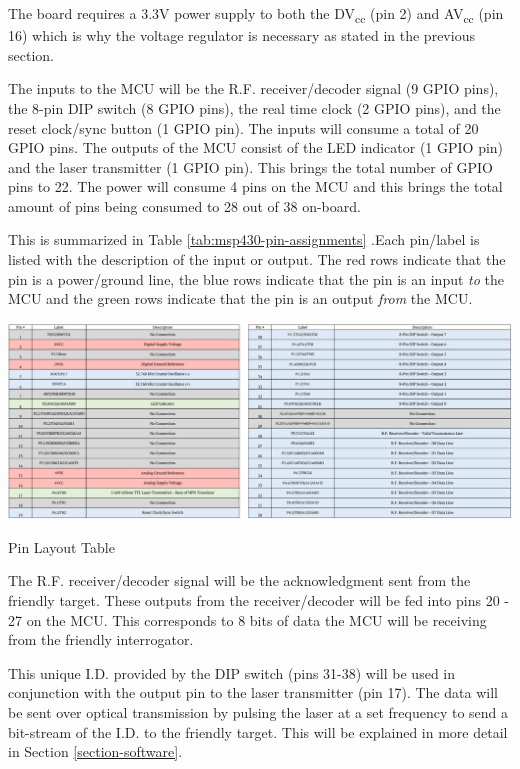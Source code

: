 \documentclass[letterpaper,10pt]{article}
\begin{document}
\begin{spacing}{1.15}
The board requires a 3.3V power supply to both the DV\textsubscript{cc} (pin 2) and AV\textsubscript{cc} (pin 16) which is why the voltage regulator is necessary as stated in the previous section. 

The inputs to the MCU will be the R.F. receiver/decoder signal (9 GPIO pins), the 8-pin DIP switch (8 GPIO pins), the real time clock (2 GPIO pins), and the reset clock/sync button (1 GPIO pin). The inputs will consume a total of 20 GPIO pins. The outputs of the MCU consist of the LED indicator (1 GPIO pin) and the laser transmitter (1 GPIO pin). This brings the total number of GPIO pins to 22. The power will consume 4 pins on the MCU and this brings the total amount of pins being consumed to 28 out of 38 on-board. 

This is summarized in Table \ref{tab:msp430-pin-assignments} .Each pin/label is listed with the description of the input or output. The red rows indicate that the pin is a power/ground line, the blue rows indicate that the pin is an input \textit{to} the MCU and the green rows indicate that the pin is an output \textit{from} the MCU.

\begin{table} [H]
	\centering
	\includegraphics[scale=0.37]{MSP430_Pin_Assignments_Interrogator.png}
	\caption{Pin Layout Table\label{tab:msp430-pin-assignments}}
\end{table}

The R.F. receiver/decoder signal will be the acknowledgment sent from the friendly target. These outputs from the receiver/decoder will be fed into pins 20 - 27 on the MCU. This corresponds to 8 bits of data the MCU will be receiving from the friendly interrogator.

This unique I.D. provided by the DIP switch (pins 31-38) will be used in conjunction with the output pin to the laser transmitter (pin 17). The data will be sent over optical transmission by pulsing the laser at a set frequency to send a bit-stream of the I.D. to the friendly target. This will be explained in more detail in Section \ref{section-software}.


\end{spacing}
\end{document}
